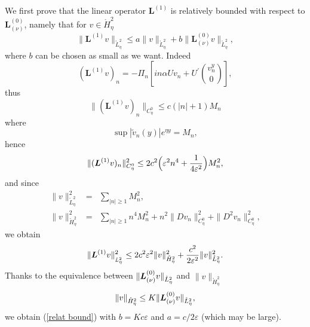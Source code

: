 \documentclass[11pt]{article}
\begin{document}




\label{proof3} 
We first prove that the linear operator $\boldsymbol{L}^{(1)}$ is relatively
bounded with respect to $\boldsymbol{L}_{(\nu )}^{(0)}$, namely that for $v\in \mathring{H}_{\eta}^{2}$%
\begin{equation}
\|\boldsymbol{L}^{(1)}v\|_{\mathring{L}_{\eta}^{2}}\leq a\|v\|_{\mathring{L}%
_{\eta}^{2}}+b\|\boldsymbol{L}_{(\nu )}^{(0)}v\|_{\mathring{L}_{\eta}^{2}},
\label{relat bound}
\end{equation}%
where $b$ can be chosen as small as we want. Indeed%
\begin{equation*}
(\boldsymbol{L}^{(1)}v)_{n}=-\Pi _{n}\left[ in\alpha Uv_{n}+U^{\prime }\binom{v_{n}^{y}}{0}\right],
\end{equation*}%
thus
\begin{equation*}
\|(\boldsymbol{L}^{(1)}v)_{n}\|_{C_{\eta}^{0}}\leq c(|n|+1)M_{n}
\end{equation*}%
where%
\begin{equation*}
\sup |\widetilde{v}_{n}(y)|e^{\eta  y}=M_{n},
\end{equation*}%
hence%
\begin{equation*}
\|(\boldsymbol{L}^{(1)}v)_{n}\|_{C_{\eta}^{0}}^{2}\leq 2c^{2} \Bigl(\varepsilon
^{2}n^{4}+\frac{1}{4\varepsilon ^{2}} \Bigr) M_{n}^{2},
\end{equation*}%
and since%
\begin{eqnarray*}
\|v\|_{\mathring{L}_{\eta}^{2}}^{2} &=&\sum_{|n|\geq 1}M_{n}^{2}, \\
\|v\|_{\mathring{H}_{\eta}^{2}}^{2} &=&\sum_{|n|\geq
1}n^{4}M_{n}^{2}+n^{2}\|Dv_{n}\|_{C_{\eta}^{0}}^{2}+\|D^{2}v_{n}\|_{C_{\eta}^{0}}^{2},
\end{eqnarray*}%
we obtain%
\begin{equation*}
\|\boldsymbol{L}^{(1)}v\|_{_{\mathring{L}_{\eta}^{2}}}^{2}\leq
2c^{2}\varepsilon ^{2}\|v\|_{\mathring{H}_{\eta}^{2}}^{2}+\frac{c^{2}}{%
2\varepsilon ^{2}}\|v\|_{\mathring{L}_{\eta}^{2}}^{2}.
\end{equation*}%
Thanks to the equivalence between $\|\boldsymbol{L}_{(\nu )}^{(0)}v\|_{%
\mathring{L}_{\eta}^{2}}$ and $\|v\|_{\mathring{H}_{\eta}^{2}}$ 
\begin{equation*}
\|v\|_{\mathring{H}_{\eta}^{2}}\leq K\|\boldsymbol{L}_{(\nu )}^{(0)}v\|_{%
\mathring{L}_{\eta}^{2}},
\end{equation*}%
we obtain (\ref{relat bound}) with $b=Kc\varepsilon $ and $a= c / 2 \varepsilon$
(which may be large). 
\end{document}
